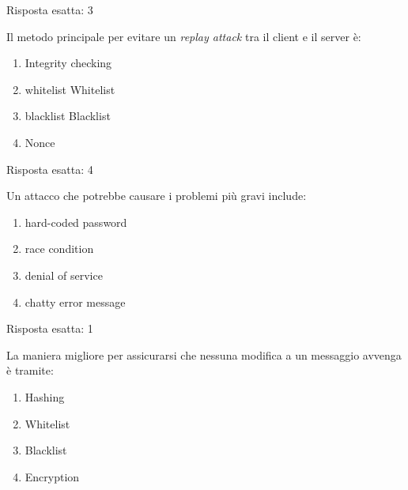 \begin{Answer} [
  ref={esControlli7},
  number={7}
  ]

  \Question Risposta esatta: 3
\end{Answer}


\begin{Exercise} [
  title={Quiz},
  label={esControlli8}
  ]

  \Question Il metodo principale per evitare un \textit{replay attack} tra il 
client e il server è:
\begin{enumerate}
\item Integrity checking
\item whitelist Whitelist
\item blacklist Blacklist
\item Nonce
\end{enumerate}

\end{Exercise}

\begin{Answer} [
  ref={esControlli8},
  number={8}
  ]

  \Question Risposta esatta: 4
\end{Answer}


\begin{Exercise} [
  title={Quiz},
  label={esControlli9}
  ]

  \Question Un attacco che potrebbe causare i problemi più gravi include:
  \begin{enumerate}
    \item hard-coded password
    \item race condition
    \item denial of service
    \item chatty error message
  \end{enumerate}

\end{Exercise}

\begin{Answer} [
  ref={esControlli9},
  number={9}
  ]

  \Question Risposta esatta: 1
\end{Answer}


\begin{Exercise} [
  title={Quiz},
  label={esControlli10}
  ]

  \Question La maniera migliore per assicurarsi che nessuna modifica a un 
messaggio avvenga è tramite:
\begin{enumerate}
  \item Hashing
  \item Whitelist
  \item Blacklist
  \item Encryption
\end{enumerate}

\end{Exercise}

